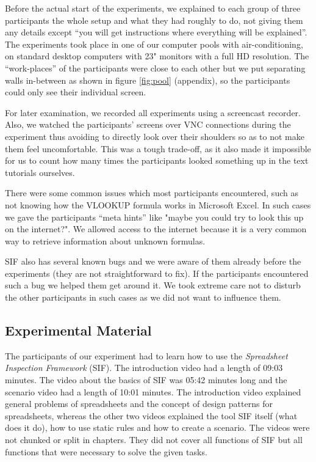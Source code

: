 Before the actual start of the experiments, we explained to each group of three participants the whole setup and what they had roughly to do, not giving them any details except \enquote{you will get instructions where everything will be explained}. The experiments took place in one of our computer pools with air-conditioning, on standard desktop computers with 23" monitors with a full HD resolution. The \enquote{work-places} of the participants were close to each other but we put separating walls in-between as shown in figure \ref{fig:pool} (appendix), so the participants could only see their individual screen.



For later examination, we recorded all experiments using a screencast recorder. Also, we watched the participants' screens over VNC connections during the experiment thus avoiding to directly look over their shoulders so as to not make them feel uncomfortable. This was a tough trade-off, as it also made it impossible for us to count how many times the participants looked something up in the text tutorials ourselves.

There were some common issues which most participants encountered, such as not knowing how the VLOOKUP formula works in Microsoft Excel. In such cases we gave the participants \enquote{meta hints} like "maybe you could try to look this up on the internet?". We allowed access to the internet because it is a very common way to retrieve information about unknown formulas.


SIF also has several known bugs and we were aware of them already before the experiments (they are not straightforward to fix). If the participants encountered such a bug we helped them get around it. We took extreme care not to disturb the other participants in such cases as we did not want to influence them.




\subsection{Experimental Material}
The participants of our experiment had to learn how to use the \textit{Spreadsheet Inspection Framework} (SIF). 
The introduction video had a length of 09:03 minutes. The video about the basics of SIF was 05:42 minutes long and the scenario video had a length of 10:01 minutes. The introduction video explained general problems of spreadsheets and the concept of design patterns for spreadsheets, whereas the other two videos explained the tool SIF itself (what does it do), how to use static rules and how to create a scenario. The videos were not chunked or split in chapters. They did not cover all functions of SIF but all functions that were necessary to solve the given tasks. 

